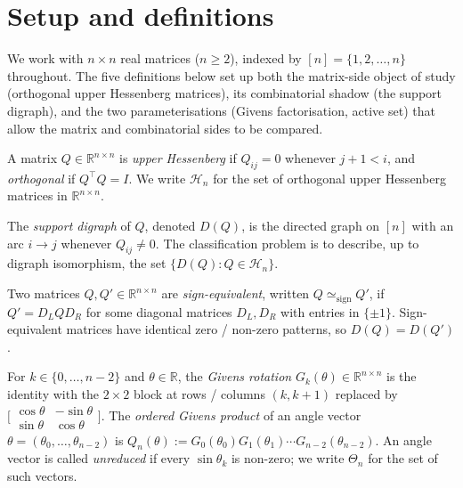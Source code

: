 \chapter{Setup and definitions}

We work with $n \times n$ real matrices ($n \ge 2$), indexed by
$[n] = \{1, 2, \dots, n\}$ throughout. The five definitions below set up
both the matrix-side object of study (orthogonal upper Hessenberg
matrices), its combinatorial shadow (the support digraph), and the two
parameterisations (Givens factorisation, active set) that allow the
matrix and combinatorial sides to be compared.

\begin{definition}\label{def:OH}
  \leanok
  A matrix $Q \in \mathbb{R}^{n\times n}$ is \emph{upper Hessenberg} if
  $Q_{ij} = 0$ whenever $j+1 < i$, and \emph{orthogonal} if
  $Q^\top Q = I$. We write $\mathcal H_n$ for the set of orthogonal
  upper Hessenberg matrices in $\mathbb{R}^{n\times n}$.
\end{definition}

\begin{definition}\label{def:supp}
  \leanok
  The \emph{support digraph} of $Q$, denoted $D(Q)$, is the directed
  graph on $[n]$ with an arc $i \to j$ whenever $Q_{ij} \ne 0$. The
  classification problem is to describe, up to digraph isomorphism, the
  set $\{D(Q) : Q \in \mathcal H_n\}$.
\end{definition}

\begin{definition}\label{def:sign}
  \leanok
  Two matrices $Q, Q' \in \mathbb{R}^{n\times n}$ are \emph{sign-equivalent},
  written $Q \simeq_{\mathrm{sign}} Q'$, if $Q' = D_L Q D_R$ for some
  diagonal matrices $D_L, D_R$ with entries in $\{\pm 1\}$.
  Sign-equivalent matrices have identical zero / non-zero patterns, so
  $D(Q) = D(Q')$.
\end{definition}

\begin{definition}\label{def:givens}
  \leanok
  For $k \in \{0,\dots,n-2\}$ and $\theta \in \mathbb{R}$, the \emph{Givens
  rotation} $G_k(\theta) \in \mathbb{R}^{n\times n}$ is the identity with the
  $2\times 2$ block at rows / columns $(k, k+1)$ replaced by
  $\bigl[\begin{smallmatrix}\cos\theta & -\sin\theta\\ \sin\theta & \cos\theta\end{smallmatrix}\bigr]$.
  The \emph{ordered Givens product} of an angle vector
  $\theta = (\theta_0, \dots, \theta_{n-2})$ is
  $Q_n(\theta) := G_0(\theta_0) G_1(\theta_1) \cdots G_{n-2}(\theta_{n-2})$.
  An angle vector is called \emph{unreduced} if every $\sin\theta_k$
  is non-zero; we write $\Theta_n$ for the set of such vectors.
\end{definition}

